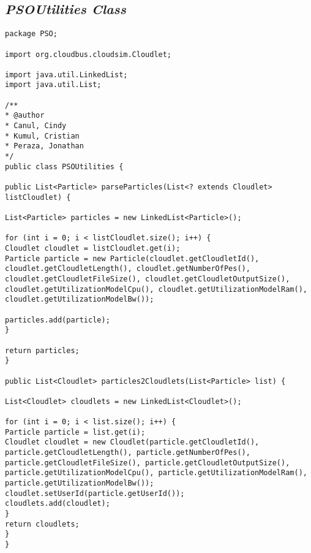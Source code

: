 \subsection*{\textit{PSOUtilities Class}}
\begin{lstlisting}
package PSO;

import org.cloudbus.cloudsim.Cloudlet;

import java.util.LinkedList;
import java.util.List;

/**
* @author
* Canul, Cindy
* Kumul, Cristian
* Peraza, Jonathan
*/
public class PSOUtilities {

public List<Particle> parseParticles(List<? extends Cloudlet> listCloudlet) {

List<Particle> particles = new LinkedList<Particle>();

for (int i = 0; i < listCloudlet.size(); i++) {
Cloudlet cloudlet = listCloudlet.get(i);
Particle particle = new Particle(cloudlet.getCloudletId(), cloudlet.getCloudletLength(), cloudlet.getNumberOfPes(), cloudlet.getCloudletFileSize(), cloudlet.getCloudletOutputSize(), cloudlet.getUtilizationModelCpu(), cloudlet.getUtilizationModelRam(), cloudlet.getUtilizationModelBw());

particles.add(particle);
}

return particles;
}

public List<Cloudlet> particles2Cloudlets(List<Particle> list) {

List<Cloudlet> cloudlets = new LinkedList<Cloudlet>();

for (int i = 0; i < list.size(); i++) {
Particle particle = list.get(i);
Cloudlet cloudlet = new Cloudlet(particle.getCloudletId(), particle.getCloudletLength(), particle.getNumberOfPes(), particle.getCloudletFileSize(), particle.getCloudletOutputSize(), particle.getUtilizationModelCpu(), particle.getUtilizationModelRam(), particle.getUtilizationModelBw());
cloudlet.setUserId(particle.getUserId());
cloudlets.add(cloudlet);
}
return cloudlets;
}
}

\end{lstlisting}